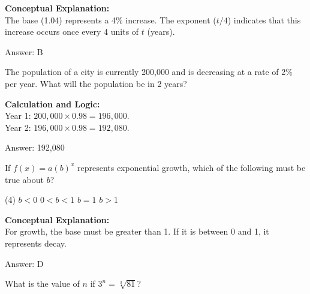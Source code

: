 \documentclass[11pt,paper=a4,answers]{exam}
\begin{document}
\begin{questions}
\begin{solution}
\textbf{Conceptual Explanation:} \\
The base (1.04) represents a 4\% increase. The exponent ($t/4$) indicates that this increase occurs once every 4 units of $t$ (years).

\vspace{25pt}

Answer: \colorbox{yellow!100}{B}
\end{solution}

\vspace{40pt}

\question
The population of a city is currently 200,000 and is decreasing at a rate of 2\% per year. What will the population be in 2 years?

\begin{solution}
\textbf{Calculation and Logic:} \\
Year 1: $200,000 \times 0.98 = 196,000$. \\
Year 2: $196,000 \times 0.98 = 192,080$.

\vspace{25pt}

Answer: \colorbox{yellow!100}{192,080}
\end{solution}

\vspace{40pt}

\question
If $f(x) = a(b)^x$ represents exponential growth, which of the following must be true about $b$?
\begin{tasks}(4)
    \task $b < 0$
    \task $0 < b < 1$
    \task $b = 1$
    \task $b > 1$
\end{tasks}

\begin{solution}
\textbf{Conceptual Explanation:} \\
For growth, the base must be greater than 1. If it is between 0 and 1, it represents decay.

\vspace{25pt}

Answer: \colorbox{yellow!100}{D}
\end{solution}

\vspace{40pt}

\question
What is the value of $n$ if $3^n = \sqrt[3]{81}$?


\end{questions}
\end{document}
